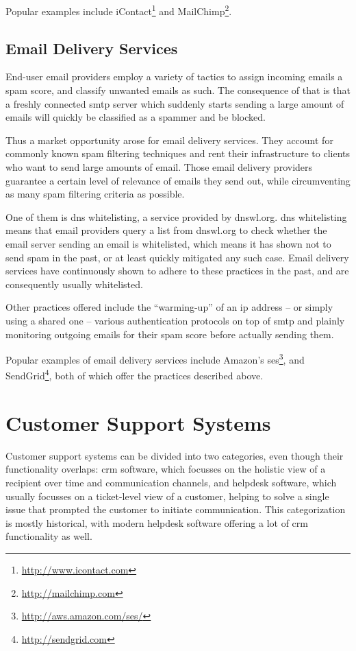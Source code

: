 Popular examples include iContact\footnote{\url{http://www.icontact.com}} and MailChimp\footnote{\url{http://mailchimp.com}}.

\subsection{Email Delivery Services}

End-user email providers employ a variety of tactics to assign incoming emails a \gls{spam} score, and classify unwanted emails as such. The consequence of that is that a freshly connected \gls{smtp} server which suddenly starts sending a large amount of emails will quickly be classified as a \gls{spam}mer and be blocked.

Thus a market opportunity arose for email delivery services. They account for commonly known \gls{spam} filtering techniques and rent their infrastructure to clients who want to send large amounts of email. Those email delivery providers guarantee a certain level of relevance of emails they send out, while circumventing as many \gls{spam} filtering criteria as possible.

One of them is \gls{dns} whitelisting, a service provided by dnswl.org\citep{dnswl}. \gls{dns} whitelisting means that email providers query a list from dnswl.org to check whether the email server sending an email is whitelisted, which means it has shown not to send \gls{spam} in the past, or at least quickly mitigated any such case. Email delivery services have continuously shown to adhere to these practices in the past, and are consequently usually whitelisted.

Other practices offered include the ``warming-up'' of an \gls{ip} address -- or simply using a shared one -- various authentication protocols on top of \gls{smtp} and plainly monitoring outgoing emails for their \gls{spam} score before actually sending them.

Popular examples of email delivery services include Amazon's \acrfull{ses}\footnote{\url{http://aws.amazon.com/ses/}}, and SendGrid\footnote{\url{http://sendgrid.com}}, both of which offer the practices described above.

\section{Customer Support Systems}

Customer support systems can be divided into two categories, even though their functionality overlaps: \gls{crm} software, which focusses on the holistic view of a recipient over time and communication channels, and helpdesk software, which usually focusses on a ticket-level view of a customer, helping to solve a single issue that prompted the customer to initiate communication. This categorization is mostly historical, with modern helpdesk software offering a lot of \gls{crm} functionality as well.

